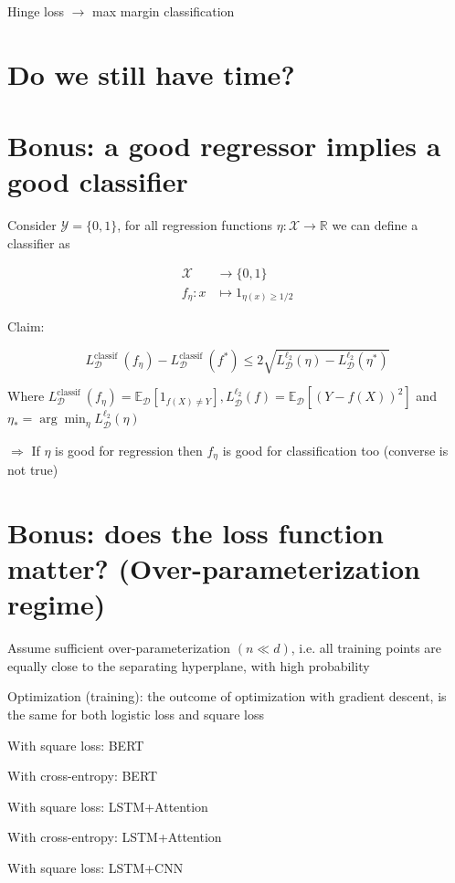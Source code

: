 \documentclass[10pt]{article}
\begin{document}
Hinge loss $\rightarrow$ max margin classification

\section*{Do we still have time?}
\section*{Bonus: a good regressor implies a good classifier}
Consider $\mathscr{Y}=\{0,1\}$, for all regression functions $\eta: \mathscr{X} \rightarrow \mathbb{R}$ we can define a classifier as

$$
\begin{aligned}
\mathscr{X} & \rightarrow\{0,1\} \\
f_{\eta}: x & \mapsto 1_{\eta(x) \geq 1 / 2}
\end{aligned}
$$

Claim:

$$
L_{\mathscr{D}}^{\text {classif }}\left(f_{\eta}\right)-L_{\mathscr{D}}^{\text {classif }}\left(f^{*}\right) \leq 2 \sqrt{L_{\mathscr{D}}^{\ell_{2}}(\eta)-L_{\mathscr{D}}^{\ell_{2}}\left(\eta^{*}\right)}
$$

Where $L_{\mathscr{D}}^{\text {classif }}\left(f_{\eta}\right)=\mathbb{E}_{\mathscr{D}}\left[1_{f(X) \neq Y}\right], L_{\mathscr{D}}^{\ell_{2}}(f)=\mathbb{E}_{\mathscr{D}}\left[(Y-f(X))^{2}\right]$ and $\eta_{*}=\arg \min _{\eta} L_{\mathscr{D}}^{\ell_{2}}(\eta)$

$\Rightarrow$ If $\eta$ is good for regression then $f_{\eta}$ is good for classification too (converse is not true)

\section*{Bonus: does the loss function matter? (Over-parameterization regime)}
Assume sufficient over-parameterization $(n \ll d)$, i.e. all training points are equally close to the separating hyperplane, with high probability

Optimization (training): the outcome of optimization with gradient descent, is the same for both logistic loss and square loss

With square loss: BERT

With cross-entropy: BERT

With square loss: LSTM+Attention

With cross-entropy: LSTM+Attention

With square loss: LSTM+CNN
\end{document}
